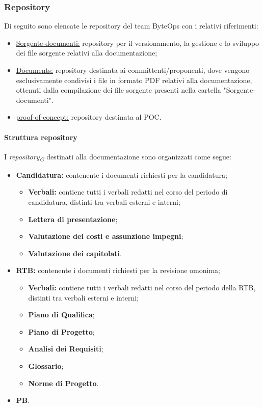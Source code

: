 \subsubsection{Repository}
Di seguito sono elencate le repository del team ByteOps con i relativi riferimenti:
\begin{itemize}
    \item \href{https://github.com/ByteOps-swe/Sorgente-documenti}{Sorgente-documenti:} repository per il versionamento, la gestione e lo sviluppo dei file sorgente relativi alla documentazione;
    \item \href{https://github.com/ByteOps-swe/Documents}{Documents:} repository destinata ai committenti/proponenti, dove vengono esclusivamente condivisi i file in formato PDF relativi alla documentazione, ottenuti dalla compilazione dei file sorgente presenti nella cartella "Sorgente-documenti".
    \item \href{https://github.com/ByteOps-swe/proof-of-concept}{proof-of-concept:} repository destinata al POC.
\end{itemize}
\paragraph{Struttura repository}
I \textit{repository}\textsubscript{\textit{G}} destinati alla documentazione sono organizzati come segue:
\begin{itemize}
    \item \textbf{Candidatura:} contenente i documenti richiesti per la candidatura;
          \begin{itemize}
              \item \textbf{Verbali:} contiene tutti i verbali redatti nel corso del periodo di candidatura, distinti tra verbali esterni e interni;
              \item \textbf{Lettera di presentazione};
              \item \textbf{Valutazione dei costi e assunzione impegni};
              \item \textbf{Valutazione dei capitolati}.
          \end{itemize}
    \item \textbf{RTB:} contenente i documenti richiesti per la revisione omonima;
          \begin{itemize}
              \item \textbf{Verbali:} contiene tutti i verbali redatti nel corso del periodo della RTB, distinti tra verbali esterni e interni;
              \item \textbf{Piano di Qualifica};
              \item \textbf{Piano di Progetto};
              \item \textbf{Analisi dei Requisiti};
              \item \textbf{Glossario};
              \item \textbf{Norme di Progetto}.
          \end{itemize}
    \item \textbf{PB}.
\end{itemize}



